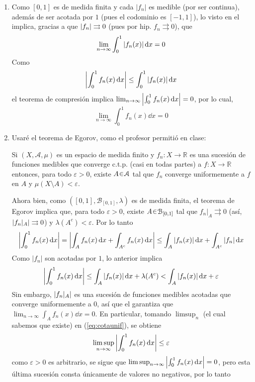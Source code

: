 \begin{sol}
\begin{enumerate}[label = (\roman*)]
\item %
Como $[0,1]$ es de medida finita y cada $|f_n|$ es medible (por ser continua), además de ser acotada por $1$ (pues el codominio es $[-1,1]$), lo visto en el  implica, gracias a que $\abs{f_n} \rightrightarrows0$ (pues por hip. $f_n \rightrightarrows 0$), que
\[
\lim_{n \to \infty} \int_0^1 \abs{f_n(x)} \dd{x} = 0
\]
Como
\[
\abs{\int_0^1f_n(x) \dd{x}}\leq \int_0^1 \abs{f_n(x)} \dd{x}
\]
el teorema de compresión implica $\lim_{n\to\infty} \abs{\int_0^1f_n(x) \dd{x}} = 0$, por lo cual, 
\[
\lim_{n\to\infty} \int_0^1f_n(x) \dd{x} = 0
\]
\item %
Usaré el teorema de Egorov, como el profesor permitió en clase:
\begin{teo}[Egorov]
Si $(X,\mathcal{A},\mu)$ es un espacio de medida finito y $f_n\colon X \to \mathbb{R}$ es una sucesión de funciones medibles que converge c.t.p. (casi en todas partes) a $f \colon X \to \mathbb{R}$ entonces, para todo $\varepsilon >0$, existe $A\en\mathcal{A}$ tal que $f_n$ converge uniformemente a $f$ en $A$ y $\mu(X\setminus A) < \varepsilon$.
\end{teo}
Ahora bien, como $([0,1],\mathcal{B}_{[0,1]},\lambda)$ es de medida finita, el teorema de Egorov implica que, para todo $\varepsilon>0$, existe $A\en\mathcal{B}_{[0,1]}$ tal que $f_n|_A \rightrightarrows 0$ (así, $\abs{f_n|_A} \rightrightarrows 0$) y $
\lambda(A^c) < \varepsilon$. Por lo tanto
\[
\abs{\int^1_0f_n(x) \dd{x}} 
= \abs{\int_A f_n(x) \dd{x} + \int_{A^c} f_n(x) \dd{x}}
\leq \int_A \abs{f_n(x)} \dd{x} + \int_{A^c}\abs{f_n} \dd{x}
\]
Como $|f_n|$ son acotadas por $1$, lo anterior implica 
\begin{equation}\label{eq:cotaunif}
\abs{\int^1_0f_n(x) \dd{x}} \leq \int_A \abs{f_n(x)} \dd{x} + \lambda(A^c) < \int_{A}\abs{f_n(x)} \dd{x} + \varepsilon
\end{equation}
Sin embargo, $\abs{f_n|_A}$ es una sucesión de funciones medibles acotadas que converge uniformemente a $0$, así que el  garantiza que $\lim_{n\to\infty} \int_Af_n(x) \dd{x} = 0$. En particular, tomando $\limsup_n$ (el cual sabemos que existe) en (\ref{eq:cotaunif}), se obtiene
\[
\limsup_{n\to\infty} \abs{\int^1_0f_n(x) \dd{x}} \leq \varepsilon
\]
como $\varepsilon>0$ es arbitrario, se sigue que $\limsup_{n\to\infty} \abs{\int^1_0f_n(x) \dd{x}} = 0$, pero esta última sucesión consta únicamente de valores no negativos, por lo tanto 

\end{enumerate}
\end{sol}

